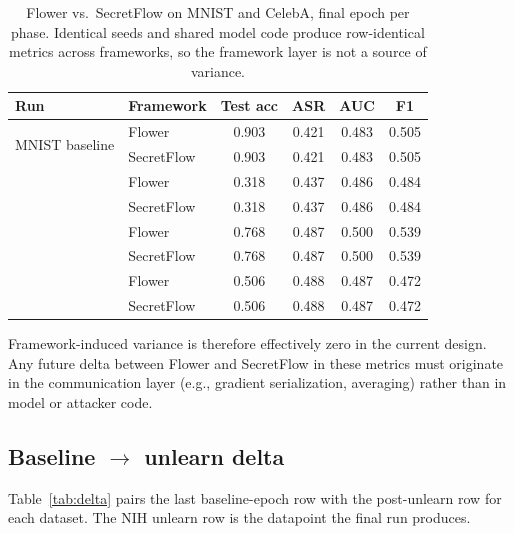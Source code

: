 \documentclass[letterpaper,twocolumn,10pt]{article}
\begin{document}
\begin{table}[t]
\centering
\small
\caption{Flower vs.\ SecretFlow on MNIST and CelebA, final epoch per phase.
Identical seeds and shared model code produce row-identical metrics across
frameworks, so the framework layer is not a source of variance.}
\label{tab:parity}
\begin{tabular}{@{}llcccc@{}}
\toprule
Run & Framework & Test acc & ASR & AUC & F1 \\
\midrule
\multirow{2}{*}{MNIST baseline}
    & Flower     & 0.903 & 0.421 & 0.483 & 0.505 \\
    & SecretFlow & 0.903 & 0.421 & 0.483 & 0.505 \\
\addlinespace[2pt]
\multirow{2}{*}{MNIST unlearn}
    & Flower     & 0.318 & 0.437 & 0.486 & 0.484 \\
    & SecretFlow & 0.318 & 0.437 & 0.486 & 0.484 \\
\addlinespace[2pt]
\multirow{2}{*}{CelebA baseline}
    & Flower     & 0.768 & 0.487 & 0.500 & 0.539 \\
    & SecretFlow & 0.768 & 0.487 & 0.500 & 0.539 \\
\addlinespace[2pt]
\multirow{2}{*}{CelebA unlearn}
    & Flower     & 0.506 & 0.488 & 0.487 & 0.472 \\
    & SecretFlow & 0.506 & 0.488 & 0.487 & 0.472 \\
\bottomrule
\end{tabular}
\end{table}

Framework-induced variance is therefore effectively zero in the current
design. Any future delta between Flower and SecretFlow in these metrics
must originate in the communication layer (e.g., gradient serialization,
averaging) rather than in model or attacker code.

\subsection{Baseline $\rightarrow$ unlearn delta}

Table~\ref{tab:delta} pairs the last baseline-epoch row with the
post-unlearn row for each dataset. The NIH unlearn row is the datapoint
the final run produces.
\end{document}
